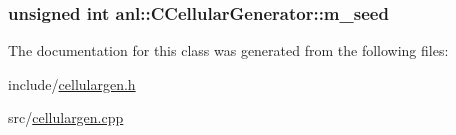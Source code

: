 \label{classanl_1_1CCellularGenerator_a6dc91f70aa9ee7c8253b0b4e4faf3d75}
\hypertarget{classanl_1_1CCellularGenerator_a547f19e49e06388d374a6dfb8b945b0b}{
\subsubsection[{m\_\-seed}]{\setlength{\rightskip}{0pt plus 5cm}unsigned int {\bf anl::CCellularGenerator::m\_\-seed}}}
\label{classanl_1_1CCellularGenerator_a547f19e49e06388d374a6dfb8b945b0b}


The documentation for this class was generated from the following files:\begin{DoxyCompactItemize}
\item 
include/\hyperlink{cellulargen_8h}{cellulargen.h}\item 
src/\hyperlink{cellulargen_8cpp}{cellulargen.cpp}\end{DoxyCompactItemize}
